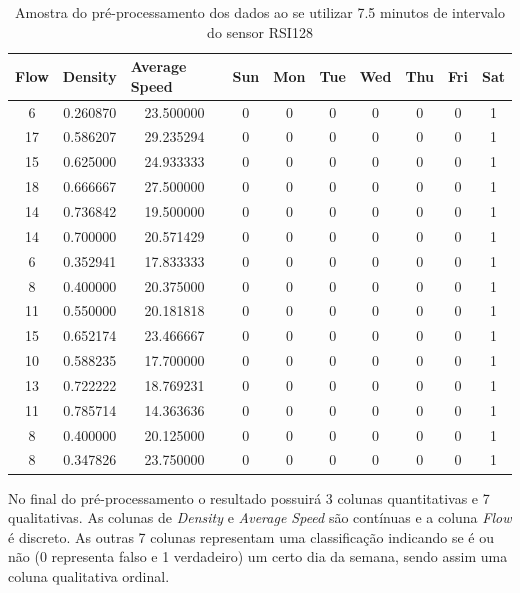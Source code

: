 \begin{table}[H]
    \begin{tabular}{cccccccccc}
    \toprule
    \multicolumn{1}{l}{\textbf{Flow}} & \multicolumn{1}{l}{\textbf{Density}} & \multicolumn{1}{l}{\textbf{Average Speed}} & \multicolumn{1}{l}{\textbf{Sun}} &
    \multicolumn{1}{l}{\textbf{Mon}} & \multicolumn{1}{l}{\textbf{Tue}} & \multicolumn{1}{l}{\textbf{Wed}} & \multicolumn{1}{l}{\textbf{Thu}} &
    \multicolumn{1}{l}{\textbf{Fri}} &
    \multicolumn{1}{l}{\textbf{Sat}} \\
    \midrule
     6 & 0.260870 & 23.500000 & 0 & 0 & 0 & 0 & 0 & 0 & 1 \\
    \midrule
    17 & 0.586207 & 29.235294 & 0 & 0 & 0 & 0 & 0 & 0 & 1 \\
    \midrule
    15 & 0.625000 & 24.933333 & 0 & 0 & 0 & 0 & 0 & 0 & 1 \\
    \midrule
    18 & 0.666667 & 27.500000 & 0 & 0 & 0 & 0 & 0 & 0 & 1 \\
    \midrule
    14 & 0.736842 & 19.500000 & 0 & 0 & 0 & 0 & 0 & 0 & 1 \\
    \midrule
    14 & 0.700000 & 20.571429 & 0 & 0 & 0 & 0 & 0 & 0 & 1 \\
    \midrule
     6 & 0.352941 & 17.833333 & 0 & 0 & 0 & 0 & 0 & 0 & 1 \\
    \midrule
     8 & 0.400000 & 20.375000 & 0 & 0 & 0 & 0 & 0 & 0 & 1 \\
    \midrule
    11 & 0.550000 & 20.181818 & 0 & 0 & 0 & 0 & 0 & 0 & 1 \\
    \midrule
    15 & 0.652174 & 23.466667 & 0 & 0 & 0 & 0 & 0 & 0 & 1 \\
    \midrule
    10 & 0.588235 & 17.700000 & 0 & 0 & 0 & 0 & 0 & 0 & 1 \\
    \midrule
    13 & 0.722222 & 18.769231 & 0 & 0 & 0 & 0 & 0 & 0 & 1 \\
    \midrule
    11 & 0.785714 & 14.363636 & 0 & 0 & 0 & 0 & 0 & 0 & 1 \\
    \midrule
     8 & 0.400000 & 20.125000 & 0 & 0 & 0 & 0 & 0 & 0 & 1 \\
    \midrule
     8 & 0.347826 & 23.750000 & 0 & 0 & 0 & 0 & 0 & 0 & 1 \\
    \bottomrule
    \end{tabular}
    \label{table:data_pre}
    \caption{Amostra do pré-processamento dos dados ao se utilizar 7.5 minutos de intervalo do sensor RSI128}
\end{table}

No final do pré-processamento o resultado possuirá 3 colunas quantitativas e 7 qualitativas. As colunas de \textit{Density} e \textit{Average Speed} são contínuas e a coluna \textit{Flow} é discreto. As outras 7 colunas representam uma classificação indicando se é ou não (0 representa falso e 1 verdadeiro) um certo dia da semana, sendo assim uma coluna qualitativa ordinal.

